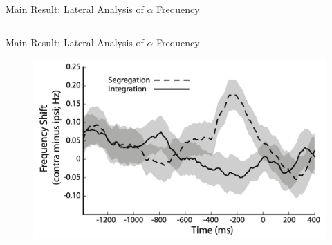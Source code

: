 \begin{frame}{Main Result: Lateral Analysis of $\alpha$ Frequency}
\begin{columns}
\begin{column}{0.55\textwidth}
        \end{column}
        \end{columns}
    
\end{frame}

\begin{frame}{Main Result: Lateral Analysis of $\alpha$ Frequency}
 
    \begin{figure}\label{fig:res4_2}
    \centering
    \includegraphics[height = 0.75 \textheight]{images/res4_2.png}
    \end{figure}
    
\end{frame}

